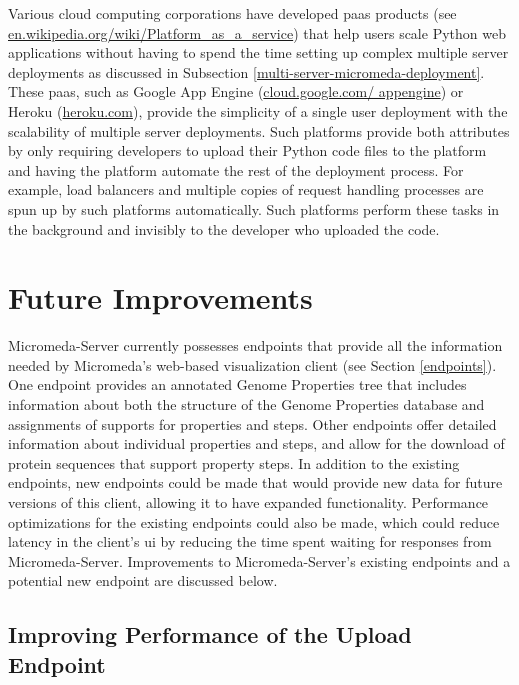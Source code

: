 Various cloud computing corporations have developed \gls{paas} 
\cite{lawton2008developing} products (see 
\href{http://en.wikipedia.org/wiki/Platform_as_a_service}{en.wikipedia.org/wiki/Platform\_as\_a\_service}) 
that help users scale Python web applications without having to spend the time 
setting up complex multiple server deployments as discussed in Subsection 
\ref{multi-server-micromeda-deployment}. These \gls{paas}, such as Google App 
Engine (\href{http://cloud.google.com/appengine}{cloud.google.com/ appengine}) 
or Heroku (\href{http://heroku.com}{heroku.com}), provide the simplicity of a 
single user deployment with the scalability of multiple server deployments. Such 
platforms provide both attributes by only requiring developers to upload their 
Python code files to the platform and having the platform automate the rest of 
the deployment process. For example, load balancers and multiple copies of 
request handling processes are spun up by such platforms automatically. Such 
platforms perform these tasks in the background and invisibly to the developer 
who uploaded the code.

\section{Future Improvements} \label{micromeda-server-improvements}

Micromeda-Server currently possesses endpoints that provide all the information 
needed by Micromeda’s web-based visualization client (see Section 
\ref{endpoints}). One endpoint provides an annotated Genome Properties tree that 
includes information about both the structure of the Genome Properties database 
and assignments of supports for properties and steps. Other endpoints offer 
detailed information about individual properties and steps, and allow for the 
download of protein sequences that support property steps. In addition to the 
existing endpoints, new endpoints could be made that would provide new data for 
future versions of this client, allowing it to have expanded functionality. 
Performance optimizations for the existing endpoints could also be made, which 
could reduce latency in the client’s \gls{ui} by reducing the time spent waiting 
for responses from Micromeda-Server. Improvements to Micromeda-Server’s existing 
endpoints and a potential new endpoint are discussed below.

\subsection{Improving Performance of the Upload Endpoint}

